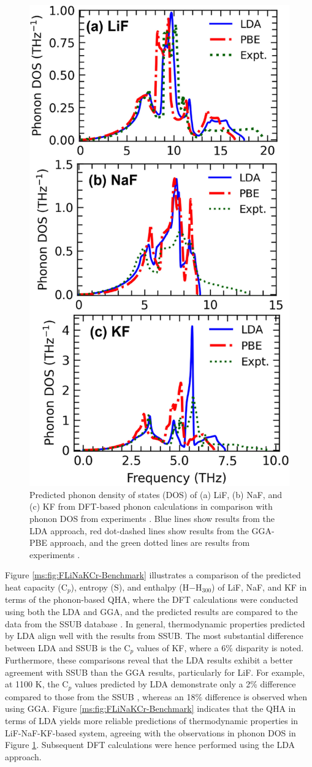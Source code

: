 \begin{figure}[H]
    \centering
    \includegraphics[width=0.45\linewidth]{moltensalts/Moltensalts-FLiNaKCr-PhononDOS.jpg}
    \caption{Predicted phonon density of states (DOS) of (a) LiF, (b) NaF, and (c) KF from DFT-based phonon calculations in comparison with phonon DOS from experiments \cite{dolling1968lattice, buhrer1970lattice, karo1969lattice}. Blue lines show results from the LDA approach, red dot-dashed lines show results from the GGA-PBE approach, and the green dotted lines are results from experiments \cite{dolling1968lattice, buhrer1970lattice, karo1969lattice}. }
    \label{ms:fig:FLiNaKCrphonon}
\end{figure}

Figure \ref{ms:fig:FLiNaKCr-Benchmark} illustrates a comparison of the predicted heat capacity (C$_p$), entropy (S), and enthalpy (H$-$H$_{300}$) of LiF, NaF, and KF in terms of the phonon-based QHA, where the DFT calculations were conducted using both the LDA and GGA, and the predicted results are compared to the data from the SSUB database \cite{sgteurl}. In general, thermodynamic properties predicted by LDA align well with the results from SSUB. The most substantial difference between LDA and SSUB is the C$_p$ values of KF, where a 6\% disparity is noted. Furthermore, these comparisons reveal that the LDA results exhibit a better agreement with SSUB than the GGA results, particularly for LiF. For example, at 1100 K, the C$_p$ values predicted by LDA demonstrate only a 2\% difference compared to those from the SSUB \cite{sgteurl}, whereas an 18\% difference is observed when using GGA. Figure \ref{ms:fig:FLiNaKCr-Benchmark} indicates that the QHA in terms of LDA yields more reliable predictions of thermodynamic properties in LiF-NaF-KF-based system, agreeing with the observations in phonon DOS in Figure \ref{ms:fig:FLiNaKCrphonon}. Subsequent DFT calculations were hence performed using the LDA approach. 

